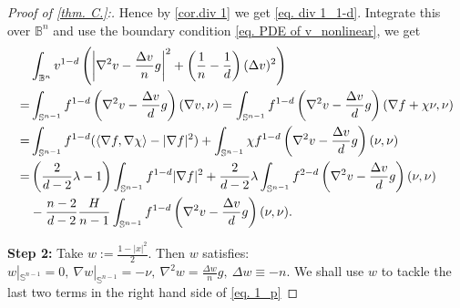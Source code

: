 \documentclass[12pt]{amsart}
\numberwithin{equation}{section}
\numberwithin{lemma}{section}
\numberwithin{proposition}{section}
\numberwithin{corollary}{section}
\numberwithin{remark}{section}
\begin{document}
\begin{proof}[Proof of \cref{thm. C.}:]
    Hence by \cref{cor.div 1} we get \cref{eq. div 1_1-d}. Integrate this over $\mathbb{B}^n$ and use the boundary condition \cref{eq. PDE of v_nonlinear}, we get
    \begin{align}\label{eq. 1_p}
        &\int_{\mathbb{B}^n}v^{1-d}\left(
        \left|\nabla^2 v-\frac{\Delta v}{n}g\right|^2
        +\left(\frac{1}{n}-\frac{1}{d}\right)(\Delta v)^2
        \right)\notag\\
        =&\int_{\mathbb{S}^{n-1}}f^{1-d}
        \left(\nabla^2 v-\frac{\Delta v}{d}g\right)(\nabla v,\nu)\notag
        =\int_{\mathbb{S}^{n-1}}f^{1-d}
        \left(\nabla^2 v-\frac{\Delta v}{d}g\right)(\nabla f+\chi\nu,\nu)\\
        =&\int_{\mathbb{S}^{n-1}}f^{1-d}(\langle \nabla f,\nabla \chi\rangle-|\nabla f|^2)
        +\int_{\mathbb{S}^{n-1}}\chi f^{1-d}
        \left(\nabla^2 v-\frac{\Delta v}{d}g\right)(\nu,\nu)\notag\\
        =&\left(\frac{2}{d-2}\lambda-1\right)
        \int_{\mathbb{S}^{n-1}}f^{1-d}|\nabla f|^2
        +\frac{2}{d-2}\lambda
        \int_{\mathbb{S}^{n-1}}f^{2-d}
        \left(\nabla^2 v-\frac{\Delta v}{d}g\right)(\nu,\nu)\notag\\
        &-\frac{n-2}{d-2}\frac{H}{n-1}
        \int_{\mathbb{S}^{n-1}}f^{1-d}
        \left(\nabla^2 v-\frac{\Delta v}{d}g\right)(\nu,\nu).
    \end{align}
    
\textbf{Step 2:} Take $w:=\frac{1-|x|^2}{2}$. Then $w$ satisfies: $w|_{\mathbb{S}^{n-1}}=0,\ \nabla w|_{\mathbb{S}^{n-1}}=-\nu,\  \nabla^2 w=\frac{\Delta w}{n}g,\ \Delta w\equiv-n$. We shall use $w$ to tackle the last two terms in the right hand side of \cref{eq. 1_p}


\end{proof}
\end{document}
